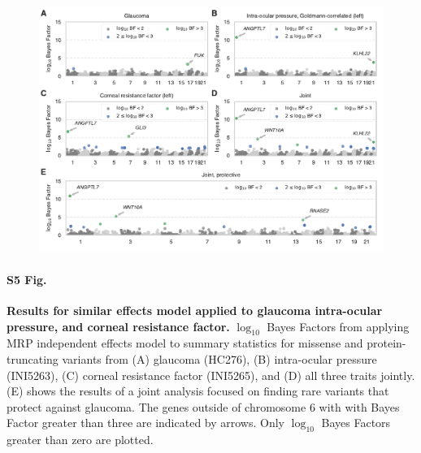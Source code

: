 \begin{figure}[H]
\includegraphics[width=\textwidth]{../figures/Figure_S05.pdf}
\end{figure}
\paragraph*{S5 Fig.}
\label{glaucoma_independent}
{\bf Results for similar effects model applied to glaucoma intra-ocular pressure, and corneal resistance factor.} $\log_{10}$ Bayes Factors from applying MRP independent effects model to summary statistics for missense and protein-truncating variants from (A) glaucoma (HC276), (B) intra-ocular pressure (INI5263), (C) corneal resistance factor (INI5265), and (D) all three traits jointly. (E) shows the results of a joint analysis focused on finding rare variants that protect against glaucoma. The genes outside of chromosome 6 with with Bayes Factor greater than three are indicated by arrows. Only $\log_{10}$ Bayes Factors greater than zero are plotted.

